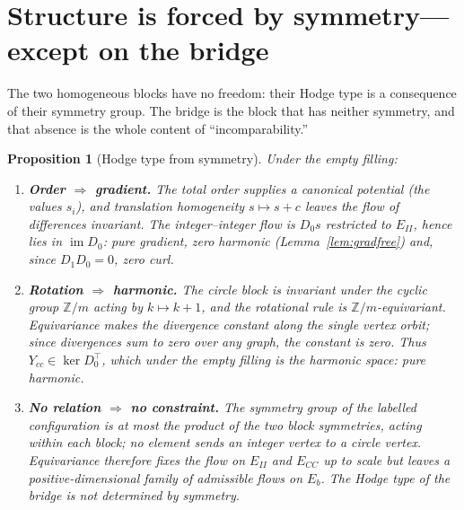 \documentclass[11pt,a4paper]{article}
\newtheorem{proposition}{Proposition}
\theoremstyle{definition}
\theoremstyle{remark}
\newcommand{\Z}{\mathbb{Z}}
\newcommand{\im}{\operatorname{im}}
\begin{document}
\section{Structure is forced by symmetry---except on the bridge}

The two homogeneous blocks have no freedom: their Hodge type is a consequence of their symmetry group. The bridge is the block that has neither symmetry, and that absence is the whole content of ``incomparability.''

\begin{proposition}[Hodge type from symmetry]\label{prop:hodgetype}
Under the empty filling:
\begin{enumerate}
\item[(a)] \textbf{Order $\Rightarrow$ gradient.} The total order supplies a canonical potential (the values $s_i$), and translation homogeneity $s\mapsto s+c$ leaves the flow of differences invariant. The integer--integer flow is $D_0s$ restricted to $E_{II}$, hence lies in $\im D_0$: pure gradient, zero harmonic (Lemma~\ref{lem:gradfree}) and, since $D_1D_0=0$, zero curl.

\item[(b)] \textbf{Rotation $\Rightarrow$ harmonic.} The circle block is invariant under the cyclic group $\Z/m$ acting by $k\mapsto k+1$, and the rotational rule is $\Z/m$-equivariant. Equivariance makes the divergence constant along the single vertex orbit; since divergences sum to zero over any graph, the constant is zero. Thus $Y_{cc}\in\ker D_0^{\top}$, which under the empty filling is the harmonic space: pure harmonic.

\item[(c)] \textbf{No relation $\Rightarrow$ no constraint.} The symmetry group of the labelled configuration is at most the product of the two block symmetries, acting within each block; no element sends an integer vertex to a circle vertex. Equivariance therefore fixes the flow on $E_{II}$ and $E_{CC}$ up to scale but leaves a positive-dimensional family of admissible flows on $E_b$. The Hodge type of the bridge is not determined by symmetry.
\end{enumerate}
\end{proposition}
\end{document}
